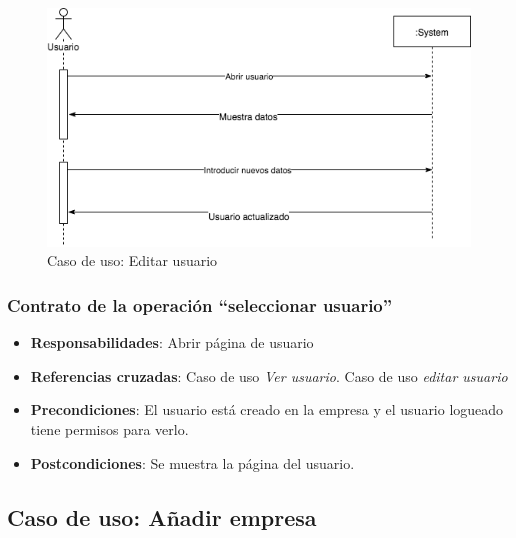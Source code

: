 \documentclass[12pt,a4paperpaper,]{report}
\providecommand{\tightlist}{%
  \setlength{\itemsep}{0pt}\setlength{\parskip}{0pt}}
\begin{document}
\begin{figure}
\centering
\includegraphics{source/figures/secuencia-editar-usuario.png}
\caption{Caso de uso: Editar usuario \label{secuencia_editar_usuario}}
\end{figure}

\subsubsection{\texorpdfstring{Contrato de la operación ``seleccionar
usuario''}{Contrato de la operación seleccionar usuario}}\label{contrato-de-la-operaciuxf3n-seleccionar-usuario}

\begin{itemize}
\tightlist
\item
  \textbf{Responsabilidades}: Abrir página de usuario
\item
  \textbf{Referencias cruzadas}: Caso de uso \emph{Ver usuario}. Caso de
  uso \emph{editar usuario}
\item
  \textbf{Precondiciones}: El usuario está creado en la empresa y el
  usuario logueado tiene permisos para verlo.
\item
  \textbf{Postcondiciones}: Se muestra la página del usuario.
\end{itemize}

\subsection{Caso de uso: Añadir
empresa}\label{caso-de-uso-auxf1adir-empresa-1}
\end{document}

